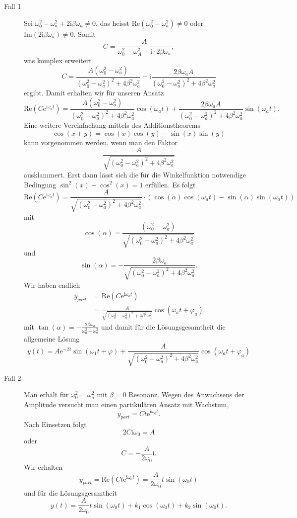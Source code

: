 \documentclass[%
11pt,%
twoside,%
titlepage,%
swissgerman,%
headsepline%
]{scrartcl}
\theoremstyle{definition}
\theoremstyle{plain}
\begin{document}
\begin{description}
\item[Fall 1] Sei $\omega_0^2-\omega_a^2+2\mathrm{i}\beta\omega_a\neq0$, das heisst $\mathrm{Re}(\omega_0^2-\omega_a^2)\neq0$ oder $\mathrm{Im}(2\mathrm{i}\beta\omega_a)\neq0$. Somit
$$C=\frac{A}{\omega_0^2-\omega_A^2+\mathrm{i}\cdot 2\beta\omega_a},$$
was komplex erweitert
$$
C=\frac{A(\omega_0^2-\omega_a^2)}{(\omega_0^2-\omega_a^2)^2+4\beta^2\omega_a^2}-\mathrm{i}\frac{2\beta\omega_a A}{(\omega_0^2-\omega_a^2)^2+4\beta^2\omega_a^2}
$$
ergibt. Damit erhalten wir für unseren Ansatz
$$
\mathrm{Re}(C\mathrm{e}^{\mathrm{i}\omega_a t})=\frac{A(\omega_0^2-\omega_a^2)}{(\omega_0^2-\omega_a^2)^2+4\beta^2\omega_a^2}\cos(\omega_a t)+\frac{2\beta\omega_a A}{(\omega_0^2-\omega_a^2)^2+4\beta^2\omega_a^2}\sin(\omega_a t).
$$
Eine weitere Vereinfachung mittels des Additionstheorems
$$\cos(x+y)=\cos(x)\cos(y)-\sin(x)\sin(y)$$
kann vorgenommen werden, wenn man den Faktor
$$\frac{A}{\sqrt{(\omega_0^2-\omega_a^2)^2+4\beta^2\omega_a^2}}$$
ausklammert. Erst dann lässt sich die für die Winkelfunktion notwendige Bedingung $\sin^2(x)+\cos^2(x)=1$ erfüllen. Es folgt
$$
\mathrm{Re}(C\mathrm{e}^{\mathrm{i}\omega_a t})=\frac{A}{\sqrt{(\omega_0^2-\omega_a^2)^2+4\beta^2\omega_a^2}}\cdot(\cos(\alpha)\cos(\omega_a t)-\sin(\alpha)\sin(\omega_a t))
$$
mit
$$\cos(\alpha)=\frac{(\omega_0^2-\omega_a^2)}{\sqrt{(\omega_0^2-\omega_a^2)^2+4\beta^2\omega_a^2}}$$
und
$$\sin(\alpha)=-\frac{2\beta\omega_a}{\sqrt{(\omega_0^2-\omega_a^2)^2+4\beta^2\omega_a^2}}.$$
Wir haben endlich
\begin{align*}
y_{part}&=\mathrm{Re}(C\mathrm{e}^{\mathrm{i}\omega_a t})\\
&=\frac{A}{\sqrt{(\omega_0^2-\omega_a^2)^2+4\beta^2\omega_a^2}}\cos(\omega_a t+\varphi_a)
\end{align*}
mit $\tan(\alpha)=-\frac{2\beta\omega_a}{\omega_0^2-\omega_a^2}$ und damit für die Lösungsgesamtheit die allgemeine Lösung
$$
y(t)=A\mathrm{e}^{-\beta t}\sin(\omega_1 t+\varphi)+\frac{A}{\sqrt{(\omega_0^2-\omega_a^2)^2+4\beta^2\omega_a^2}}\cos(\omega_a t+\varphi_a)
$$

\item[Fall 2] Man erhält für $\omega_0^2=\omega_a^2$ mit $\beta=0$ Resonanz. Wegen des Anwachsens der Amplitude versucht man einen partikulären Ansatz mit Wachstum,
$$y_{part}=Ct\mathrm{e}^{\mathrm{i}\omega_0 t}.$$
Nach Einsetzen folgt
$$2C\mathrm{i}\omega_0=A$$
oder
$$C=-\frac{A}{2\omega_0}\mathrm{i}.$$
Wir erhalten
$$y_{part}=\mathrm{Re}(Ct\mathrm{e}^{\mathrm{i}\omega_0 t})=\frac{A}{2\omega_0}t\sin(\omega_0 t)$$
und für die Lösungsgesamtheit
$$
y(t)=\frac{A}{2\omega_0}t\sin(\omega_0 t)+k_1\cos(\omega_0 t)+k_2\sin(\omega_0 t).
$$

\end{description}
\end{document}
